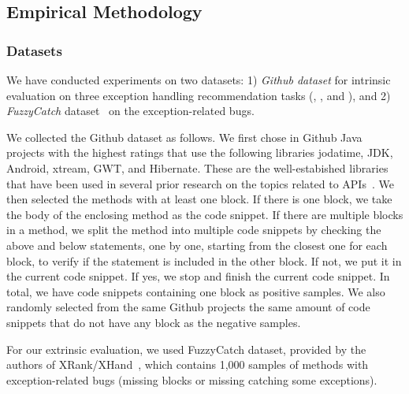 \subsection{Empirical Methodology}

\subsubsection{Datasets}


We have conducted experiments on two datasets: 1) {\em Github dataset}
for intrinsic evaluation on three exception handling recommendation
tasks ({\xblock}, {\xstate}, and {\xtype}), and 2) {\em FuzzyCatch}
dataset~\cite{xrank-fse20} on the exception-related bugs.


We collected the Github dataset as follows. We first chose in Github
{\color{red}{\bf XXX}} Java projects with the highest ratings that use
the following libraries jodatime, JDK, Android, xtream, GWT, and
Hibernate. These are the well-estabished libraries that have been used
in several prior research on the topics related to
APIs~\cite{icse18,liveapi14}. We then selected the methods with at
least one  block. If there is one 
block, we take the body of the enclosing method as the code
snippet. If there are multiple  blocks in a method, we
split the method into multiple code snippets by checking the above and
below statements, one by one, starting from the closest one for each
 block, to verify if the statement is included in the
other block. If not, we put it in the current code snippet. If yes, we
stop and finish the current code snippet. In total, we have
{\color{red}{\bf XX,XXX}} code snippets containing one
 block as positive samples. We also randomly selected
from the same Github projects the same amount of code snippets that do
not have any  block as the negative samples.

For our extrinsic evaluation, we used FuzzyCatch dataset, provided by
the authors of XRank/XHand~\cite{xrank-fse20}, which contains 1,000
samples of methods with exception-related bugs (missing
 blocks or missing catching some exceptions).



